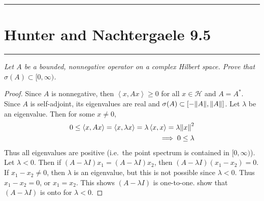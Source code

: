 \documentclass{article} %
\theoremstyle{plain}
\newcommand{\VEC}[2]{\left\langle #1, #2 \right\rangle}
\newcommand{\Hilb}{\mathcal{H}}
\newcommand{\problem}[1]{
\vspace{.375cm}
\begin{minipage}{\textwidth}
    \begin{center}
        \noindent\rule{5cm}{1pt}
    \end{center}
    \section{\bf #1}
    \begin{center}
        \noindent\rule{5cm}{1pt}
    \end{center}
    \vspace{0.25cm}
\end{minipage}
}
\numberwithin{equation}{section} %
\numberwithin{figure}{section} %
\numberwithin{table}{section} %
\begin{document}
\problem{Hunter and Nachtergaele 9.5}
\emph{Let $A$ be a bounded, nonnegative operator on a complex Hilbert space.  Prove that $\sigma(A) \subset [0, \infty)$.}
\begin{proof}
    Since $A$ is nonnegative, then $\VEC{x}{Ax} \geq 0$ for all $x \in \Hilb$ and $A = A^*$.  Since $A$ is self-adjoint, its eigenvalues are real and $\sigma(A) \subset \qty[-\norm{A}, \norm{A}]$.  Let $\lambda$ be an eigenvalue.  Then for some $x \neq 0$,
    \begin{align*}
        0 \leq \VEC{x}{Ax} = \VEC{x}{\lambda x} = \lambda \VEC{x}{x} = \lambda \norm{x}^2 \\
        \implies 0 \leq \lambda
    \end{align*}
    Thus all eigenvalues are positive (i.e.~the point spectrum is contained in $[0, \infty)$).  Let $\lambda < 0$.  Then if $(A - \lambda I)x_1 = (A - \lambda I)x_2$, then $(A - \lambda I)(x_1 - x_2) = 0$.  If $x_1 - x_2 \neq 0$, then $\lambda$ is an eigenvalue, but this is not possible since $\lambda < 0$.  Thus $x_1 - x_2 = 0$, or $x_1 = x_2$.  This shows $(A - \lambda I)$ is one-to-one.
    {\color{red} show that $(A - \lambda I)$ is onto for $\lambda < 0$.}
\end{proof}
\end{document}
